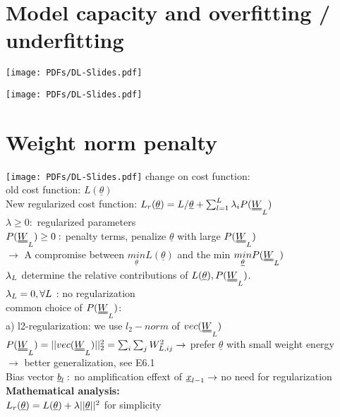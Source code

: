 \section{Model capacity and overfitting / underfitting}
\texttt{[image: PDFs/DL-Slides.pdf]}

\texttt{[image: PDFs/DL-Slides.pdf]}
\section{Weight norm penalty}
\texttt{[image: PDFs/DL-Slides.pdf]}
change on cost function: \\
\textbullet old cost function: $ L(\underline{\theta}) $\\
\textbullet New regularized cost function: $ L_r (\underline{\theta}) = L /\underline{\theta}  + \sum_{l=1}^{L} \lambda_i P(\W_L)$ \\
$  \lambda \geq 0: $ regularized parameters \\
$  P(\W_L) \geq 0 :  $ penalty terms, penalize $  \underline{\theta} $ with large $ P(\W_L) $\\
$ \rightarrow  $ A compromise between $ \underset{\underline{\theta}}{min} L(\underline{\theta}) $ and the min $ \underset{\underline{\theta}}{min} P(\W_L) $\\
$ \lambda_L   $ determine the relative contributions of $  L(\underline{\theta}), P(\W_L) $. \\
$  \lambda_L = 0, \forall L  $ : no regularization \\
common choice of $  P(\W_L) $: \\
\textbullet a) l2-regularization: we use $ l_2-norm $ of $ vec(\W_L) $ \\
$  P(\W_L) = || vec (\W_L ) ||^2_{2} = \sum_{i}^{} \sum_{j}^{} W_{L,ij}^2 \rightarrow $ prefer $ \underline{\theta} $ with small weight energy \\
$\rightarrow$ better generalization, see E6.1\\
Bias vector $ {\underline b}_l: $ no amplification effext of $ {\underline x}_{l-1} \rightarrow  $ no need for regularization \\
\textbf{Mathematical analysis:}\\
$  L_r (\underline{\theta}  ) = L(\underline{\theta}) + \lambda || \underline{\theta} ||^2 $ for simplicity \\
